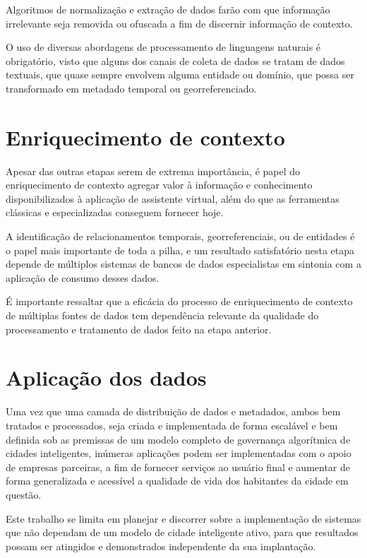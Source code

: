 Algoritmos de normalização e extração de dados farão com que informação irrelevante seja removida ou ofuscada a fim de discernir informação de contexto.

O uso de diversas abordagens de processamento de linguagens naturais é obrigatório, visto que alguns dos canais de coleta de dados se tratam de dados textuais, que quase sempre envolvem alguma entidade ou domínio, que possa ser transformado em metadado temporal ou georreferenciado.

\section{Enriquecimento de contexto} \label{s:enriquecimento_de_contexto}

Apesar das outras etapas serem de extrema importância, é papel do enriquecimento de contexto agregar valor à informação e conhecimento disponibilizados à aplicação de assistente virtual, além do que as ferramentas clássicas e especializadas conseguem fornecer hoje.

A identificação de relacionamentos temporais, georreferenciais, ou de entidades é o papel mais importante de toda a pilha, e um resultado satisfatório nesta etapa depende de múltiplos sistemas de bancos de dados especialistas em sintonia com a aplicação de consumo desses dados.

É importante ressaltar que a eficácia do processo de enriquecimento de contexto de múltiplas fontes de dados tem dependência relevante da qualidade do processamento e tratamento de dados feito na etapa anterior.

\section{Aplicação dos dados} \label{s:aplicacao_dos_dados}

Uma vez que uma camada de distribuição de dados e metadados, ambos bem tratados e processados, seja criada e implementada de forma escalável e bem definida sob as premissas de um modelo completo de governança algorítmica de cidades inteligentes, inúmeras aplicações podem ser implementadas com o apoio de empresas parceiras, a fim de fornecer serviços ao usuário final e aumentar de forma generalizada e acessível a qualidade de vida dos habitantes da cidade em questão.

Este trabalho se limita em planejar e discorrer sobre a implementação de sistemas que não dependam de um modelo de cidade inteligente ativo, para que resultados possam ser atingidos e demonstrados independente da sua implantação.